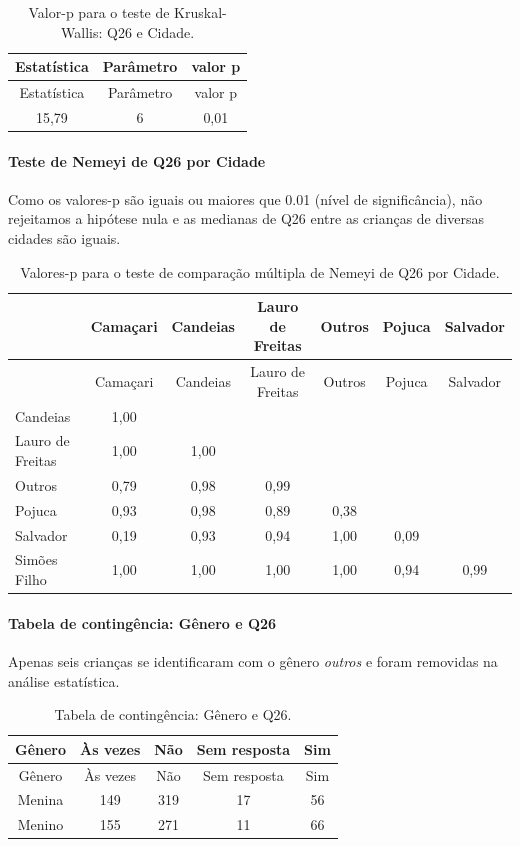 \documentclass[]{article}
\let\oldparagraph\paragraph
\renewcommand{\paragraph}[1]{\oldparagraph{#1}\mbox{}}
\begin{document}
\begin{longtable}[]{@{}ccc@{}}
\caption{\label{tab:unnamed-chunk-727}Valor-p para o teste de Kruskal-Wallis: Q26 e Cidade.}\tabularnewline
\toprule
Estatística & Parâmetro & valor p\tabularnewline
\midrule
\endfirsthead
\toprule
Estatística & Parâmetro & valor p\tabularnewline
\midrule
\endhead
15,79 & 6 & 0,01\tabularnewline
\bottomrule
\end{longtable}

\hypertarget{teste-de-nemeyi-de-q26-por-cidade}{%
\paragraph{Teste de Nemeyi de Q26 por Cidade}\label{teste-de-nemeyi-de-q26-por-cidade}}

Como os valores-p são iguais ou maiores que 0.01 (nível de significância), não rejeitamos a hipótese nula e as medianas de Q26 entre as crianças de diversas cidades são iguais.

\begin{longtable}[]{@{}lcccccc@{}}
\caption{\label{tab:unnamed-chunk-729}Valores-p para o teste de comparação múltipla de Nemeyi de Q26 por Cidade.}\tabularnewline
\toprule
& Camaçari & Candeias & Lauro de Freitas & Outros & Pojuca & Salvador\tabularnewline
\midrule
\endfirsthead
\toprule
& Camaçari & Candeias & Lauro de Freitas & Outros & Pojuca & Salvador\tabularnewline
\midrule
\endhead
Candeias & 1,00 & & & & &\tabularnewline
Lauro de Freitas & 1,00 & 1,00 & & & &\tabularnewline
Outros & 0,79 & 0,98 & 0,99 & & &\tabularnewline
Pojuca & 0,93 & 0,98 & 0,89 & 0,38 & &\tabularnewline
Salvador & 0,19 & 0,93 & 0,94 & 1,00 & 0,09 &\tabularnewline
Simões Filho & 1,00 & 1,00 & 1,00 & 1,00 & 0,94 & 0,99\tabularnewline
\bottomrule
\end{longtable}

\cleardoublepage

\hypertarget{tabela-de-continguxeancia-guxeanero-e-q26}{%
\paragraph{Tabela de contingência: Gênero e Q26}\label{tabela-de-continguxeancia-guxeanero-e-q26}}

Apenas seis crianças se identificaram com o gênero \emph{outros} e foram removidas na análise estatística.

\begin{longtable}[]{@{}ccccc@{}}
\caption{\label{tab:unnamed-chunk-730}Tabela de contingência: Gênero e Q26.}\tabularnewline
\toprule
Gênero & Às vezes & Não & Sem resposta & Sim\tabularnewline
\midrule
\endfirsthead
\toprule
Gênero & Às vezes & Não & Sem resposta & Sim\tabularnewline
\midrule
\endhead
Menina & 149 & 319 & 17 & 56\tabularnewline
Menino & 155 & 271 & 11 & 66\tabularnewline
\bottomrule
\end{longtable}
\end{document}
